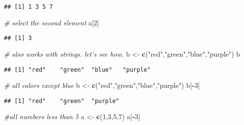 \documentclass[
]{article}
\newenvironment{Shaded}{\begin{snugshade}}{\end{snugshade}}
\newcommand{\CommentTok}[1]{\textcolor[rgb]{0.56,0.35,0.01}{\textit{#1}}}
\newcommand{\DecValTok}[1]{\textcolor[rgb]{0.00,0.00,0.81}{#1}}
\newcommand{\KeywordTok}[1]{\textcolor[rgb]{0.13,0.29,0.53}{\textbf{#1}}}
\newcommand{\NormalTok}[1]{#1}
\newcommand{\OperatorTok}[1]{\textcolor[rgb]{0.81,0.36,0.00}{\textbf{#1}}}
\newcommand{\StringTok}[1]{\textcolor[rgb]{0.31,0.60,0.02}{#1}}
\begin{document}
\begin{verbatim}
## [1] 1 3 5 7
\end{verbatim}

\begin{Shaded}
\begin{Highlighting}[]
\CommentTok{# select the second element}
\NormalTok{a[}\DecValTok{2}\NormalTok{]}
\end{Highlighting}
\end{Shaded}

\begin{verbatim}
## [1] 3
\end{verbatim}

\begin{Shaded}
\begin{Highlighting}[]
\CommentTok{# also works with strings. let's see how.}
\NormalTok{b <-}\StringTok{ }\KeywordTok{c}\NormalTok{(}\StringTok{"red"}\NormalTok{,}\StringTok{"green"}\NormalTok{,}\StringTok{"blue"}\NormalTok{,}\StringTok{"purple"}\NormalTok{)   }
\NormalTok{b}
\end{Highlighting}
\end{Shaded}

\begin{verbatim}
## [1] "red"    "green"  "blue"   "purple"
\end{verbatim}

\begin{Shaded}
\begin{Highlighting}[]
\CommentTok{# all colors except blue}
\NormalTok{b <-}\StringTok{ }\KeywordTok{c}\NormalTok{(}\StringTok{"red"}\NormalTok{,}\StringTok{"green"}\NormalTok{,}\StringTok{"blue"}\NormalTok{,}\StringTok{"purple"}\NormalTok{)   }
\NormalTok{b[}\OperatorTok{-}\DecValTok{3}\NormalTok{]}
\end{Highlighting}
\end{Shaded}

\begin{verbatim}
## [1] "red"    "green"  "purple"
\end{verbatim}

\begin{Shaded}
\begin{Highlighting}[]
\CommentTok{#all numbers less than 5}
\NormalTok{a <-}\StringTok{ }\KeywordTok{c}\NormalTok{(}\DecValTok{1}\NormalTok{,}\DecValTok{3}\NormalTok{,}\DecValTok{5}\NormalTok{,}\DecValTok{7}\NormalTok{) }
\NormalTok{a[}\OperatorTok{-}\DecValTok{3}\NormalTok{]}
\end{Highlighting}
\end{Shaded}
\end{document}
